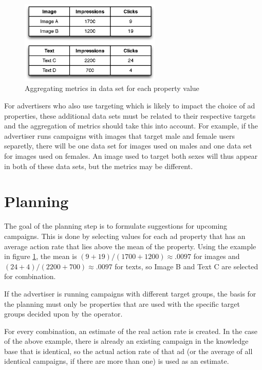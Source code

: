 \documentclass[11pt,a4paper]{report}
\begin{document}
\begin{figure}[htb] \centering \includegraphics[width=0.6\textwidth]{data-set-properties-example.eps}
	\caption{Aggregating metrics in data set for each property value}
	\label{fig:DataSetPropertiesExample}
\end{figure}

For advertisers who also use targeting which is likely to impact the choice of ad properties, these additional data sets must be related to their respective targets and the aggregation of metrics should take this into account. For example, if the advertiser runs campaigns with images that target male and female users separetly, there will be one data set for images used on males and one data set for images used on females. An image used to target both sexes will thus appear in both of these data sets, but the metrics may be different.

\section{Planning}
The goal of the planning step is to formulate suggestions for upcoming campaigns. This is done by selecting values for each ad property that has an average action rate that lies above the mean of the property. Using the example in figure \ref{fig:DataSetPropertiesExample}, the mean is \((9+19)/(1700+1200) \approx .0097\) for images and \((24+4)/(2200+700) \approx .0097\) for texts, so Image B and Text C are selected for combination.

If the advertiser is running campaigns with different target groups, the basis for the planning must only be properties that are used with the specific target groups decided upon by the operator.

For every combination, an estimate of the real action rate is created. In the case of the above example, there is already an existing campaign in the knowledge base that is identical, so the actual action rate of that ad (or the average of all identical campaigns, if there are more than one) is used as an estimate.
\end{document}
